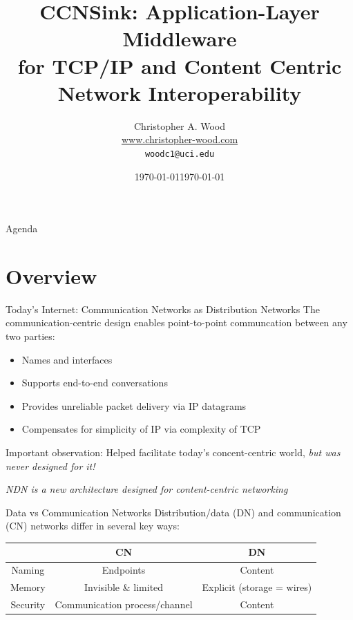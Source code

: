 \documentclass[handout]{beamer}
\title[{\sf CCNSink}]{{\sf CCNSink}: Application-Layer Middleware \\ for TCP/IP and Content Centric Network Interoperability}
\institute[Donald Bren School of Information and Computer Sciences \\ UC Irvine]{}
\date{\today}
\author[Christopher A. Wood]{Christopher A. Wood \\ \url{www.christopher-wood.com} \\ {\tt woodc1@uci.edu}}
\date{\today}
\begin{document}

\begin{frame}
	\titlepage
\end{frame}

\begin{frame}{Agenda}
	\tableofcontents
\end{frame}

\section{Overview}
\begin{frame}{Today's Internet: Communication Networks as Distribution Networks}
	The communication-centric design enables point-to-point communcation between any two parties:
	\begin{itemize}
		\item Names and interfaces
		\item Supports end-to-end conversations
		\item Provides unreliable packet delivery via IP datagrams
		\item Compensates for simplicity of IP via complexity of TCP
	\end{itemize}

	Important observation: Helped facilitate today's concent-centric world, \emph{but was never designed for it!}

	\medskip

	\emph{NDN is a new architecture designed for content-centric networking}
\end{frame}

\begin{frame}{Data vs Communication Networks}
	Distribution/data (DN) and communication (CN) networks differ in several key ways:
	\begin{table}
		\begin{tabular}{c|c|c} \hline
		~ & CN & DN \\ \hline
		Naming & Endpoints & Content \\
		Memory & Invisible \& limited & Explicit (storage = wires) \\
		Security & Communication process/channel & Content \\ \hline
		\end{tabular}
	\end{table}
\end{frame}
\end{document}
